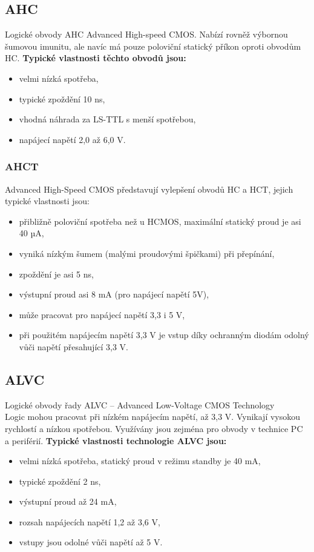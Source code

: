 \subsection{AHC}
Logické obvody AHC Advanced High-speed CMOS. Nabízí rovněž výbornou
šumovou imunitu, ale navíc má pouze poloviční statický příkon oproti obvodům HC.
\textbf{Typické vlastnosti těchto obvodů jsou:}\\
\begin{itemize}
\item velmi nízká spotřeba,
\item typické zpoždění 10 ns,
\item vhodná náhrada za LS-TTL s menší spotřebou,
\item napájecí napětí 2,0 až 6,0 V.
\end{itemize}
\subsubsection{AHCT}
Advanced High-Speed CMOS představují vylepšení obvodů HC a HCT, jejich typické vlastnosti jsou:
\begin{itemize}
\item přibližně poloviční spotřeba než u HCMOS, maximální statický proud je asi 40
µA,
\item vyniká nízkým šumem (malými proudovými špičkami) při přepínání,
\item zpoždění je asi 5 ns,
\item výstupní proud asi 8 mA (pro napájecí napětí 5V),
\item může pracovat pro napájecí napětí 3,3 i 5 V,
\item při použitém napájecím napětí 3,3 V je vstup díky ochranným diodám odolný
vůči napětí přesahující 3,3 V.
\end{itemize}

\subsection{ALVC}
Logické obvody řady ALVC – Advanced Low-Voltage CMOS Technology\\
Logic mohou pracovat při nízkém napájecím napětí, až 3,3 V. Vynikají vysokou rychlostí a nízkou spotřebou. Využívány jsou zejména pro obvody v technice PC a periférií.
\textbf{Typické vlastnosti technologie ALVC jsou:}\\
\begin{itemize}
\item velmi nízká spotřeba, statický proud v režimu standby je 40 mA,
\item typické zpoždění 2 ns,
\item výstupní proud až 24 mA,
\item rozsah napájecích napětí 1,2 až 3,6 V,
\item vstupy jsou odolné vůči napětí až 5 V.
\end{itemize}


